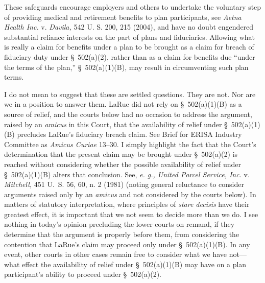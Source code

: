   These safeguards encourage employers and others to undertake the voluntary step of providing medical and retirement benefits to plan participants, see \emph{Aetna Health Inc.} v. \emph{Davila,} 542 U. S. 200, 215 (2004), and have no doubt engendered substantial reliance interests on the part of plans and fiduciaries. Allowing what is really a claim for benefits under a plan to be brought as a claim for breach of fiduciary duty under \S~502(a)(2), rather than as a claim for benefits due ``under the terms of the plan,'' \S~502(a)(1)(B), may result in circumventing such plan terms.

  I do not mean to suggest that these are settled questions. They are not. Nor are we in a position to answer them. LaRue did not rely on \S~502(a)(1)(B) as a source of relief, and the courts below had no occasion to address the argument, raised by an \emph{amicus} in this Court, that the availability of relief under \S~502(a)(1)(B) precludes LaRue's fiduciary breach claim. See Brief for ERISA Industry Committee as \emph{Amicus Curiae} 13--30. I simply highlight the fact that the Court's determination that the present claim may be brought under \S~502(a)(2) is reached without considering whether the possible availability of relief under \S~502(a)(1)(B) alters that conclusion. See, \emph{e. g., United Parcel Service, Inc.} v. \emph{Mitchell,} 451 U.~S. 56, 60, n. 2 (1981) (noting general reluctance to consider arguments raised only by an \emph{amicus} and not consid\newpage ered by the courts below). In matters of statutory interpretation, where principles of \emph{stare decisis} have their greatest effect, it is important that we not seem to decide more than we do. I see nothing in today's opinion precluding the lower courts on remand, if they determine that the argument is properly before them, from considering the contention that LaRue's claim may proceed only under \S~502(a)(1)(B). In any event, other courts in other cases remain free to consider what we have not---what effect the availability of relief under \S~502(a)(1)(B) may have on a plan participant's ability to proceed under \S~502(a)(2).

